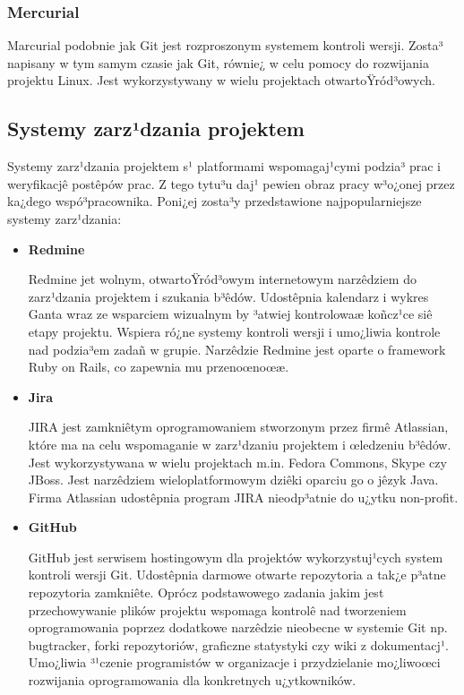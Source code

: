 	\subsubsection{Mercurial}
	Marcurial podobnie jak Git jest rozproszonym systemem kontroli wersji. Zosta³ napisany w tym samym
	czasie jak Git, równie¿ w celu pomocy do rozwijania projektu Linux. Jest wykorzystywany w wielu projektach
	otwartoŸród³owych.

\subsection{Systemy zarz¹dzania projektem}

Systemy zarz¹dzania projektem s¹ platformami wspomagaj¹cymi podzia³ prac i weryfikacjê postêpów prac.
Z tego tytu³u daj¹ pewien obraz pracy w³o¿onej przez ka¿dego wspó³pracownika. Poni¿ej zosta³y przedstawione najpopularniejsze systemy zarz¹dzania:

\begin{itemize}
	\item \textbf{Redmine}
	
	Redmine \cite{website:redmine} jet wolnym, otwartoŸród³owym internetowym narzêdziem do zarz¹dzania projektem i szukania
	b³êdów. Udostêpnia kalendarz i wykres Ganta wraz ze wsparciem wizualnym by ³atwiej kontrolowaæ
	koñcz¹ce siê etapy projektu. Wspiera ró¿ne systemy kontroli wersji i umo¿liwia kontrole nad podzia³em
	zadañ w grupie. Narzêdzie Redmine jest oparte o framework Ruby on Rails, co zapewnia mu przenoœnoœæ.

	
	\item \textbf{Jira}
	
	JIRA \cite{website:jira} jest zamkniêtym oprogramowaniem stworzonym przez firmê Atlassian, które ma na celu wspomaganie w
	zarz¹dzaniu projektem i œledzeniu b³êdów. Jest wykorzystywana w wielu projektach m.in. Fedora
	Commons, Skype czy JBoss. Jest narzêdziem wieloplatformowym dziêki oparciu go o jêzyk Java. Firma
	Atlassian  udostêpnia program JIRA nieodp³atnie do u¿ytku non-profit.


	\item \textbf{GitHub}
	
	GitHub \cite{website:github} jest serwisem hostingowym dla projektów wykorzystuj¹cych system kontroli wersji Git. Udostêpnia
	darmowe otwarte repozytoria a tak¿e p³atne repozytoria zamkniête. Oprócz podstawowego zadania jakim
	jest przechowywanie plików projektu wspomaga kontrolê nad tworzeniem oprogramowania poprzez dodatkowe
	narzêdzie nieobecne w systemie Git np. bugtracker, forki repozytoriów, graficzne statystyki czy wiki z
	dokumentacj¹. Umo¿liwia ³¹czenie programistów w organizacje i przydzielanie mo¿liwoœci rozwijania 
	oprogramowania dla konkretnych u¿ytkowników.

\end{itemize}


